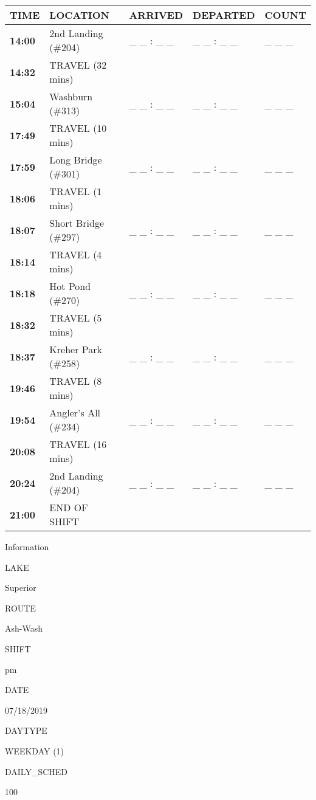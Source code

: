 \documentclass[]{article}
\begin{document}
\begin{tabular}{>{\bfseries}lllll}
\toprule
\textbf{TIME} & \textbf{LOCATION} & \textbf{ARRIVED} & \textbf{DEPARTED} & \textbf{COUNT}\\
\midrule
14:00 & 2nd Landing (\#204) & \_ \_ : \_ \_ & \_ \_ : \_ \_ & \_ \_ \_\\
14:32 & TRAVEL (32 mins) &  &  & \\
15:04 & Washburn (\#313) & \_ \_ : \_ \_ & \_ \_ : \_ \_ & \_ \_ \_\\
17:49 & TRAVEL (10 mins) &  &  & \\
17:59 & Long Bridge (\#301) & \_ \_ : \_ \_ & \_ \_ : \_ \_ & \_ \_ \_\\
18:06 & TRAVEL (1 mins) &  &  & \\
18:07 & Short Bridge (\#297) & \_ \_ : \_ \_ & \_ \_ : \_ \_ & \_ \_ \_\\
18:14 & TRAVEL (4 mins) &  &  & \\
18:18 & Hot Pond (\#270) & \_ \_ : \_ \_ & \_ \_ : \_ \_ & \_ \_ \_\\
18:32 & TRAVEL (5 mins) &  &  & \\
18:37 & Kreher Park (\#258) & \_ \_ : \_ \_ & \_ \_ : \_ \_ & \_ \_ \_\\
19:46 & TRAVEL (8 mins) &  &  & \\
19:54 & Angler's All (\#234) & \_ \_ : \_ \_ & \_ \_ : \_ \_ & \_ \_ \_\\
20:08 & TRAVEL (16 mins) &  &  & \\
20:24 & 2nd Landing (\#204) & \_ \_ : \_ \_ & \_ \_ : \_ \_ & \_ \_ \_\\
21:00 & END OF SHIFT &  &  & \\
\bottomrule
\end{tabular}\newpage

Information

LAKE

Superior

ROUTE

Ash-Wash

SHIFT

pm

DATE

07/18/2019

DAYTYPE

WEEKDAY (1)

DAILY\_SCHED

100

\vspace{24pt}
\end{document}
